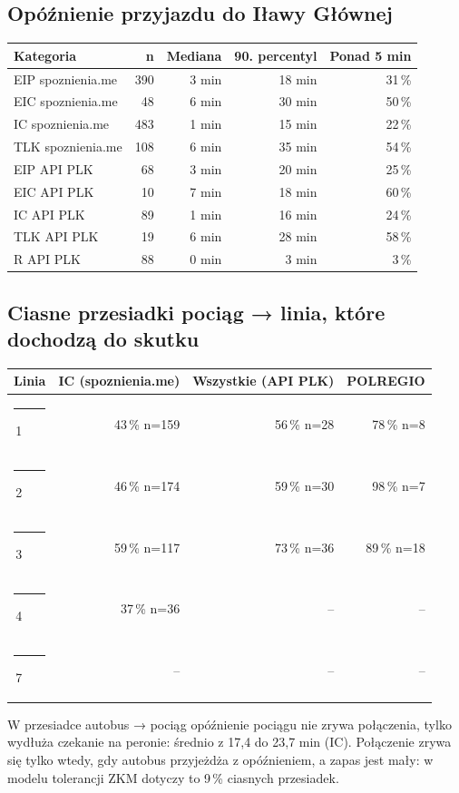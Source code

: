 \documentclass[10pt,a4paper]{article}
\newcommand{\linedot}[1]{\textcolor{#1}{\rule[0.1ex]{0.9ex}{0.9ex}}\,}
\newcommand{\mut}[1]{\textcolor{muted}{#1}}
\begin{document}
\subsection*{Opóźnienie przyjazdu do Iławy Głównej}
{\small
\begin{center}\begin{tabular}{@{}l r r r r@{}}\toprule
Kategoria & n & Mediana & 90. percentyl & Ponad 5 min \\ \midrule
EIP \mut{spoznienia.me} & 390 & 3 min & 18 min & 31\,\% \\
EIC \mut{spoznienia.me} & 48 & 6 min & 30 min & 50\,\% \\
IC \mut{spoznienia.me} & 483 & 1 min & 15 min & 22\,\% \\
TLK \mut{spoznienia.me} & 108 & 6 min & 35 min & 54\,\% \\
EIP \mut{API PLK} & 68 & 3 min & 20 min & 25\,\% \\
EIC \mut{API PLK} & 10 & 7 min & 18 min & 60\,\% \\
IC \mut{API PLK} & 89 & 1 min & 16 min & 24\,\% \\
TLK \mut{API PLK} & 19 & 6 min & 28 min & 58\,\% \\
R \mut{API PLK} & 88 & 0 min & 3 min & 3\,\% \\
\bottomrule\end{tabular}\end{center}}
\subsection*{Ciasne przesiadki pociąg → linia, które dochodzą do skutku}
{\small
\begin{center}\begin{tabular}{@{}l r r r@{}}\toprule
Linia & IC (spoznienia.me) & Wszystkie (API PLK) & POLREGIO \\ \midrule
\linedot{L1}1 & 43\,\% \mut{n=159} & 56\,\% \mut{n=28} & 78\,\% \mut{n=8} \\
\linedot{L2}2 & 46\,\% \mut{n=174} & 59\,\% \mut{n=30} & 98\,\% \mut{n=7} \\
\linedot{L3}3 & 59\,\% \mut{n=117} & 73\,\% \mut{n=36} & 89\,\% \mut{n=18} \\
\linedot{L4}4 & 37\,\% \mut{n=36} & -- & -- \\
\linedot{L7}7 & -- & -- & -- \\
\bottomrule\end{tabular}\end{center}}
W przesiadce autobus → pociąg opóźnienie pociągu nie zrywa połączenia, tylko wydłuża czekanie na peronie: średnio z 17,4 do 23,7 min (IC). Połączenie zrywa się tylko wtedy, gdy autobus przyjeżdża z opóźnieniem, a zapas jest mały: w modelu tolerancji ZKM dotyczy to 9\,\% ciasnych przesiadek.
\end{document}
